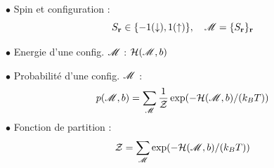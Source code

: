 \documentclass[9pt]{beamer}
\begin{document}
\begin{frame}
\begin{multicols}{2}
$\bullet$ Spin et configuration :
\begin{equation*}
 S_{\bf r} \in \{-1(\downarrow),1(\uparrow)\}, \quad \mathscr{M} = \{S_{\bf r}\}_{\bf r}
\end{equation*}


$\bullet$ Energie d'une config. $\mathscr{M}$ : $ \mathcal{H}(\mathscr{M},b)$ \\

\vspace*{11pt}
$\bullet$ Probabilité d'une config. $\mathscr{M}$ :
\begin{equation*}
p(\mathscr{M},b) = \sum_{\mathscr{M}} \frac{1}{\mathcal{Z}} \exp(-\mathcal{H}(\mathscr{M},b)/(k_BT))
\end{equation*}
$\bullet$ Fonction de partition :
\begin{equation*}
\mathcal{Z} = \sum_{\mathscr{M}}  \exp(-\mathcal{H}(\mathscr{M},b)/(k_BT))
\end{equation*}

	\end{multicols}
\end{frame}
\end{document}
